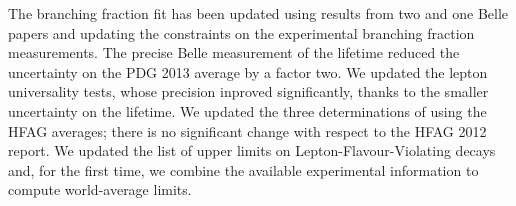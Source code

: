 The \mtau branching fraction fit has been updated using results from two
\babar and one Belle papers and updating the constraints on
the experimental branching fraction measurements.
The precise Belle measurement of the \mtau
lifetime reduced the uncertainty on the PDG 2013 average by a factor
two. We updated the lepton universality tests, whose precision inproved
significantly, thanks to the smaller uncertainty on the \mtau lifetime.
We updated the three determinations of \Vus using the \mtau HFAG averages;
there is no significant change with respect to the HFAG 2012 report.
We updated the list of upper limits on \mtau Lepton-Flavour-Violating
decays and, for the first time, we combine the available experimental
information to compute world-average limits.
